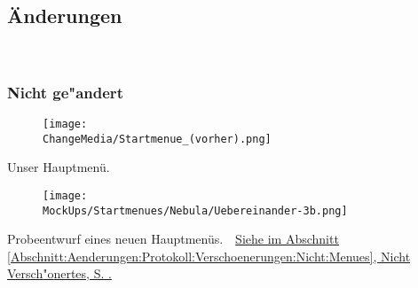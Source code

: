 %



\newpage





\subsection*{Änderungen}

~\\


\subsubsection*{Nicht ge{"a}ndert}


	\begin{figure}[ht]
	
		\label{Abb:Aenderungen:Startmenue_(vorher)}
		\centering

		\texttt{[image: \\ChangeMedia/Startmenue\_(vorher).png]}

	\end{figure}
	
Unser Hauptmenü.\\
	
	
	\begin{figure}[ht]
	
		\label{Abb:Aenderungen:Startmenue_(nachher)}
		\centering

		\texttt{[image: \\MockUps/Startmenues/Nebula/Uebereinander-3b.png]}

	\end{figure}
	
Probeentwurf eines neuen Hauptmenüs.~\mousecursor~\hyperref[Abschnitt:Aenderungen:Protokoll:Verschoenerungen:Nicht:Menues]{Siehe im Abschnitt \ref{Abschnitt:Aenderungen:Protokoll:Verschoenerungen:Nicht:Menues}, Nicht Versch{"o}nertes, S. \pageref{Abschnitt:Aenderungen:Protokoll:Verschoenerungen:Nicht:Menues}.}
